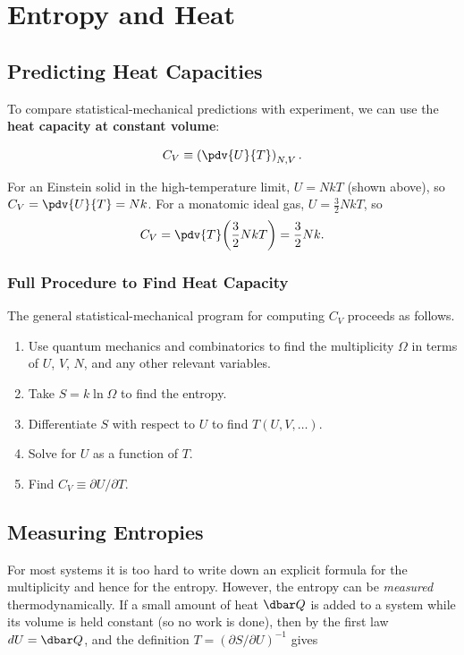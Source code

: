 \section{Entropy and Heat}

\subsection{Predicting Heat Capacities}

To compare statistical-mechanical predictions with experiment, we can use the
\textbf{heat capacity at constant volume}:
\begin{definition}
\[
  C_V \equiv \left(\pdv{U}{T}\right)_{N,V}.
\]
\end{definition}

For an Einstein solid in the high-temperature limit, $U = NkT$ (shown above), so $C_V =
\pdv{U}{T} = Nk$. For a monatomic ideal gas, $U = \frac{3}{2}NkT$, so
\[
  C_V = \pdv{T}\!\left(\frac{3}{2}NkT\right) = \frac{3}{2}Nk.
\]

\subsubsection*{Full Procedure to Find Heat Capacity}

The general statistical-mechanical program for computing $C_V$ proceeds as follows.
\begin{enumerate}[label=\arabic*.]
  \item Use quantum mechanics and combinatorics to find the multiplicity $\Omega$ in terms of
        $U$, $V$, $N$, and any other relevant variables.
  \item Take $S = k\ln\Omega$ to find the entropy.
  \item Differentiate $S$ with respect to $U$ to find $T(U, V, \ldots)$.
  \item Solve for $U$ as a function of $T$.
  \item Find $C_V \equiv \partial U/\partial T$.
\end{enumerate}

\subsection{Measuring Entropies}

For most systems it is too hard to write down an explicit formula for the multiplicity and
hence for the entropy. However, the entropy can be \emph{measured} thermodynamically. If a
small amount of heat $\dbar Q$ is added to a system while its volume is held constant (so no
work is done), then by the first law $dU = \dbar Q$, and the definition $T = (\partial S/\partial
U)^{-1}$ gives

